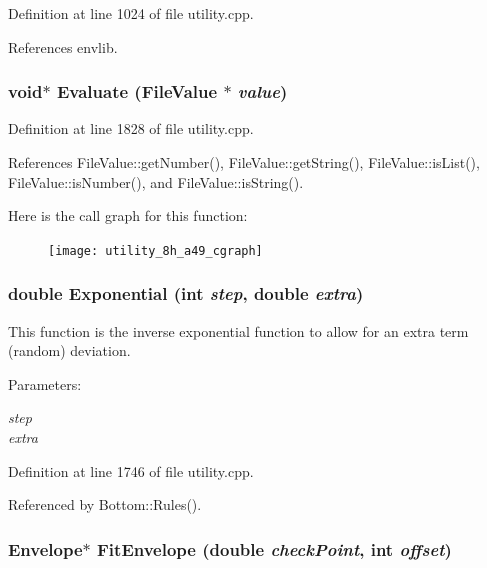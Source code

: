 Definition at line 1024 of file utility.cpp.

References envlib.
\subsubsection{\setlength{\rightskip}{0pt plus 5cm}void$\ast$ Evaluate ({\bf File\-Value} $\ast$ {\em value})}\label{utility_8h_a49}




Definition at line 1828 of file utility.cpp.

References File\-Value::get\-Number(), File\-Value::get\-String(), File\-Value::is\-List(), File\-Value::is\-Number(), and File\-Value::is\-String().

Here is the call graph for this function:\begin{figure}[H]
\begin{center}
\leavevmode
\texttt{[image: utility\_8h\_a49\_cgraph]}
\end{center}
\end{figure}
\subsubsection{\setlength{\rightskip}{0pt plus 5cm}double Exponential (int {\em step}, double {\em extra})}\label{utility_8h_a45}


This function is the inverse exponential function to allow for an extra term (random) deviation. \begin{Desc}
\item[Parameters:]
\begin{description}
\item[{\em step}]\item[{\em extra}]\end{description}
\end{Desc}


Definition at line 1746 of file utility.cpp.

Referenced by Bottom::Rules().
\subsubsection{\setlength{\rightskip}{0pt plus 5cm}Envelope$\ast$ Fit\-Envelope (double {\em check\-Point}, int {\em offset})}\label{utility_8h_a21}


